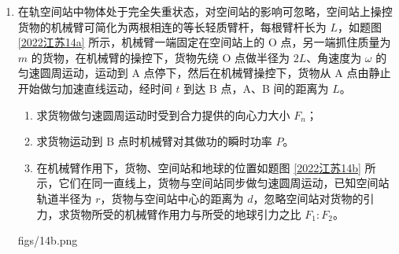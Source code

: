 \documentclass[\gkver]{gaokaozhenti}
\begin{document}
\begin{enumerate}
{\begin{enumerate}
	因为相同时间内的径迹长度之比 $l_{a}:l_{b}=3:1$，则分裂后粒子在磁场中的速度为 $v_{a}:v_{b}=3:1$，联立解得 $m_{a}:m_{b}=2:1$。

	\item
	中性粒子在 A 点分裂成带等量异号电荷的粒子 a 和 b，分裂过程中，没有外力作用，动量守恒，根据动量守恒定律 $mv = m_{a}v_{a} + m_{b}v_{b}$。

	因为分裂后动量关系为 $m_{a}v_{a}:m_{b}v_{b}=6:1$，联立解得 $p_{a}=m_{a}v_{a}=\frac{6}{7}mv$。
\end{enumerate}
}

\item
在轨空间站中物体处于完全失重状态，对空间站的影响可忽略，空间站上操控货物的机械臂可简化为两根相连的等长轻质臂杆，每根臂杆长为 $L$，如题图 \ref{2022江苏14a} 所示，机械臂一端固定在空间站上的 O 点，另一端抓住质量为 $m$ 的货物，在机械臂的操控下，货物先绕 O 点做半径为 $2L$、角速度为 $\omega$ 的匀速圆周运动，运动到 A 点停下，然后在机械臂操控下，货物从 A 点由静止开始做匀加速直线运动，经时间 $t$ 到达 B 点，A、B 间的距离为 $L$。
\begin{enumerate}
	\item
	求货物做匀速圆周运动时受到合力提供的向心力大小 $F_{n}$；
	\item
	求货物运动到 B 点时机械臂对其做功的瞬时功率 $P$。
	\item
	在机械臂作用下，货物、空间站和地球的位置如题图 \ref{2022江苏14b} 所示，它们在同一直线上，货物与空间站同步做匀速圆周运动，已知空间站轨道半径为 $r$，货物与空间站中心的距离为 $d$，忽略空间站对货物的引力，求货物所受的机械臂作用力与所受的地球引力之比 $F_{1}:F_{2}$。
\end{enumerate}
{figs/14b.png}


\end{enumerate}
\end{document}
